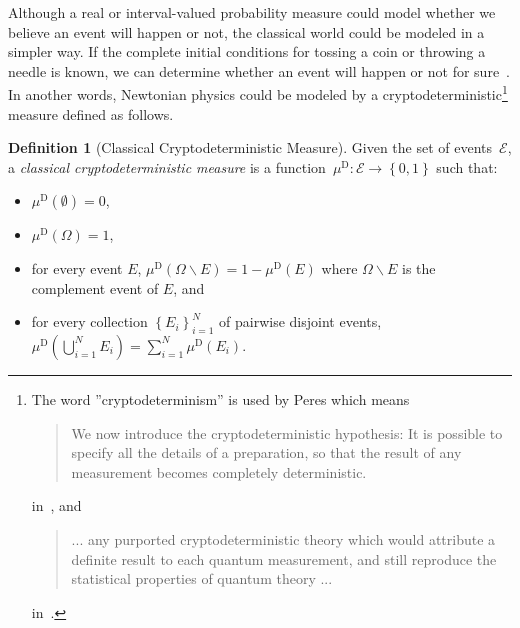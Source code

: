 \documentclass[12pt]{iopart}
\theoremstyle{plain}
\theoremstyle{definition}
\newtheorem{definition}[thm]{Definition}
\theoremstyle{remark}
\newcommand{\events}{\ensuremath{\mathcal{E}}}
\begin{document}
Although a real or interval-valued probability measure could model
whether we believe an event will happen or not, the classical world
could be modeled in a simpler way. If the complete initial conditions
for tossing a coin or throwing a needle is known, we can determine
whether an event will happen or not for sure~\cite{DiaconisHolmesMontgomery2007}.
In another words, Newtonian physics could be modeled by a cryptodeterministic\footnote{The word ''cryptodeterminism'' is used by Peres which means
\begin{quote}
We now introduce the cryptodeterministic hypothesis: It is possible
to specify all the details of a preparation, so that the result of
any measurement becomes completely deterministic.
\end{quote}
in~\cite{PeresRon1988}, and
\begin{quote}
... any purported cryptodeterministic theory which would attribute
a definite result to each quantum measurement, and still reproduce
the statistical properties of quantum theory ...
\end{quote}
in~\cite{Peres1991,peres1995quantum}.} measure defined as follows.

\begin{definition}[Classical Cryptodeterministic Measure]\label{def:CryptodeterministicMeasures}Given
the set of events~$\events$, a \emph{classical cryptodeterministic
measure} is a function~$\mu^{\mathrm{D}}:\events\rightarrow\left\{ 0,1\right\} $
such that: 
\begin{itemize}
\item $\mu^{\mathrm{D}}(\emptyset)=0$, 
\item $\mu^{\mathrm{D}}(\Omega)=1$, 
\item for every event $E$, $\mu^{\mathrm{D}}\left(\Omega\backslash E\right)=1-\mu^{\mathrm{D}}\left(E\right)$
where $\Omega\backslash E$ is the complement event of $E$, and 
\item for every collection $\left\{ E_{i}\right\} _{i=1}^{N}$ of pairwise
disjoint events, $\mu^{\mathrm{D}}\left(\bigcup_{i=1}^{N}E_{i}\right)=\sum_{i=1}^{N}\mu^{\mathrm{D}}(E_{i})$. 
\end{itemize}
\end{definition}
\end{document}
